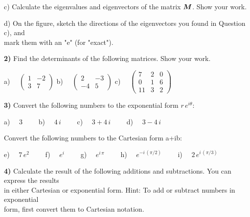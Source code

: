 \documentclass[11pt]{article}
\begin{document}
\hspace*{4mm} c) Calculate the eigenvalues and eigenvectors of the
matrix $\mbox{\boldmath $M$}$. Show your work. 

\hspace*{4mm} d) On the figure, sketch the directions of the
eigenvectors you found in Question c), and \\
\hspace*{9mm} mark them with an "e" (for "exact"). \vs

\newpage
\textbf{2)} Find the determinants of the following matrices. Show
your work.

\hspace*{4mm} a) $\quad \left( \begin{array}{cc} 1 & -2 \\ 3 & 7 \end{array} \right)$
\hspace*{9mm} b) $\quad \left( \begin{array}{cc} 2 & -3 \\ -4 & 5 \end{array} \right)$
\hspace*{9mm} c) $\quad \left( \begin{array}{ccc} 7 & 2 & 0 \\ 0 & 1 & 6 \\ 11 & 3 & 2 \end{array} \right)$

\textbf{3)} Convert the following numbers to the exponential form
$r\,e^{i\theta}$:

\hspace*{4mm} a) $\quad 3 \qquad$ b) $\quad 4\,i \qquad$ c) $\quad 3 + 4\,i \qquad $  
d) $\quad 3 - 4\,i$ \svs

\hspace*{4mm} Convert the following numbers to the Cartesian form a+ib:

\hspace*{4mm} 
e) $\quad 7\,e^2 \qquad $  
f) $\quad e^i \qquad$ 
g) $\quad e^{i\,\pi}\qquad $ 
h) $\quad e^{-i\,(\pi/2)} \qquad $ 
i) $\quad 2\,e^{i\,(\pi/3)} $ \vs 

\textbf{4)} Calculate the result of the following additions and
subtractions. You can express the results \\
\hspace*{4mm} in either Cartesian or
exponential form. Hint: To add or subtract numbers in exponential \\
\hspace*{4mm} form, first convert them to Cartesian notation.
\end{document}
